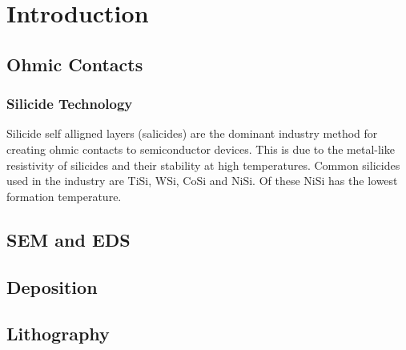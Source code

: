 
\chapter{Introduction}

\section{Ohmic Contacts}

\subsection{Silicide Technology}

Silicide self alligned layers (salicides) are the dominant industry method for creating ohmic contacts to semiconductor devices. This is due to the metal-like resistivity of silicides and their stability at high temperatures. Common silicides used in the industry are TiSi, WSi, CoSi and NiSi. Of these NiSi has the lowest formation temperature.
\section{SEM and EDS}
\section{Deposition}
\section{Lithography}

\cleardoublepage
